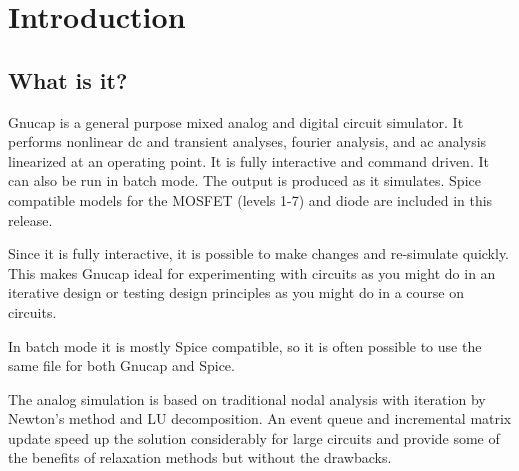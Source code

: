 %
%
%
%
\chapter{Introduction}
\section{What is it?}

Gnucap is a general purpose mixed analog and digital circuit simulator.
It performs nonlinear dc and transient analyses, fourier analysis, and
ac analysis linearized at an operating point.  It is fully interactive
and command driven.  It can also be run in batch mode.  The output is
produced as it simulates.  Spice compatible models for the MOSFET
(levels 1-7) and diode are included in this release.

Since it is fully interactive, it is possible to make changes and re-simulate
quickly.  This makes Gnucap ideal for experimenting with circuits as you might
do in an iterative design or testing design principles as you might do in a
course on circuits.

In batch mode it is mostly Spice compatible, so it is often possible to use
the same file for both Gnucap and Spice.

The analog simulation is based on traditional nodal analysis with iteration
by Newton's method and LU decomposition.  An event queue and incremental
matrix update speed up the solution considerably for large circuits and
provide some of the benefits of relaxation methods but without the drawbacks.

